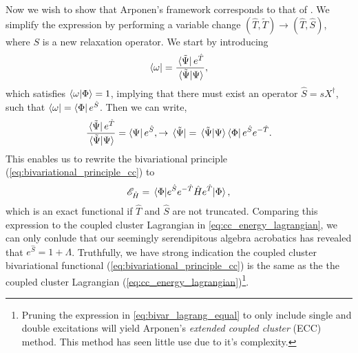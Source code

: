 Now we wish to show that Arponen's framework corresponds to that of
\citeauthor{helgaker1988analytical}. We simplify the expression by performing 
a variable change 
$(\hat{T}, \tilde{T}) \to (\hat{T}, \hat{S})$, where $S$ is a new relaxation operator.
We start by introducing 
\begin{equation}
    \bra{\omega} = \frac{\bra*{\tilde{\Psi}}e^{\hat{T}}}{\braket*{\tilde{\Psi}}{\Psi}},
\end{equation}
which satisfies $\braket{\omega}{\Phi} = 1$, implying that there must exist an operator
$\hat{S} = sX^\dagger$, such that $\bra{\omega} = \bra{\Phi}e^{\hat{S}}$. Then we 
can write,
\begin{equation}
    \begin{gathered}
        \frac{\bra*{\tilde{\Psi}}e^{\hat{T}}}{\braket*{\tilde{\Psi}}{\Psi}}
        = \bra{\Psi} e^{\hat{S}},
        \to \bra*{\tilde{\Psi}} 
        = \braket*{\tilde{\Psi}}{\Psi}\bra{\Phi}e^{\hat{S}}e^{-\hat{T}}.
    \end{gathered}
\end{equation}
This enables us to rewrite the bivariational principle (\autoref{eq:bivariational_principle_cc})
to 
\begin{equation}
    \label{eq:bivar_lagrang_equal}
    \mathscr{E}_{\hat{H}} = \mel{\Phi}{e^{\hat{S}}e^{-\hat{T}}\hat{H}e^{\hat{T}}}{\Phi},
\end{equation} 
which is an exact functional if $\hat{T}$ and $\hat{S}$ are not truncated. Comparing this 
expression to the coupled cluster Lagrangian in \autoref{eq:cc_energy_lagrangian}, we can only
conlude that our seemingly serendipitous algebra acrobatics has revealed that
$e^{\hat{S}} = 1 + \Lambda$. Truthfully, we have strong indication the coupled cluster bivariational 
functional (\autoref{eq:bivariational_principle_cc}) is the same as the the 
coupled cluster Lagrangian (\autoref{eq:cc_energy_lagrangian})\footnote{Pruning 
the expression in \autoref{eq:bivar_lagrang_equal} to only include single and double 
excitations will yield Arponen's \emph{extended coupled cluster} (ECC) 
method\cite{arponen1987extended}.
This method has seen little use due to it's complexity.}.

